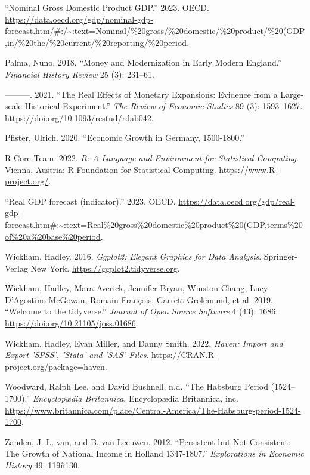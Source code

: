 \documentclass[
  letterpaper,
  DIV=11,
  numbers=noendperiod]{scrartcl}
\newlength{\cslhangindent}
\newlength{\cslentryspacingunit} %
\newenvironment{CSLReferences}[2] %
 {%
  \setlength{\parindent}{0pt}
  \ifodd #1
  \let\oldpar\par
  \def\par{\hangindent=\cslhangindent\oldpar}
  \fi
  \setlength{\parskip}{#2\cslentryspacingunit}
 }%
 {}
\begin{document}
\begin{CSLReferences}{1}{0}
\leavevmode{}%
{``Nominal {Gross} {Domestic} {Product} {GDP}.''} 2023. OECD.
\url{https://data.oecd.org/gdp/nominal-gdp-forecast.htm/\#:/~:text=Nominal/\%20gross/\%20domestic/\%20product/\%20(GDP,in/\%20the/\%20current/\%20reporting/\%20period}.

\leavevmode{}%
Palma, Nuno. 2018. {``Money and Modernization in Early Modern
England.''} \emph{Financial History Review} 25 (3): 231--61.

\leavevmode{}%
---------. 2021. {``{The Real Effects of Monetary Expansions: Evidence
from a Large-scale Historical Experiment}.''} \emph{The Review of
Economic Studies} 89 (3): 1593--1627.
\url{https://doi.org/10.1093/restud/rdab042}.

\leavevmode{}%
Pfister, Ulrich. 2020. {``Economic Growth in Germany, 1500-1800.''}

\leavevmode{}%
R Core Team. 2022. \emph{R: A Language and Environment for Statistical
Computing}. Vienna, Austria: R Foundation for Statistical Computing.
\url{https://www.R-project.org/}.

\leavevmode{}%
{``{Real GDP forecast (indicator)}.''} 2023. OECD.
\url{https://data.oecd.org/gdp/real-gdp-forecast.htm\#:~:text=Real\%20gross\%20domestic\%20product\%20(GDP,terms\%20of\%20a\%20base\%20period}.

\leavevmode{}%
Wickham, Hadley. 2016. \emph{Ggplot2: Elegant Graphics for Data
Analysis}. Springer-Verlag New York.
\url{https://ggplot2.tidyverse.org}.

\leavevmode{}%
Wickham, Hadley, Mara Averick, Jennifer Bryan, Winston Chang, Lucy
D'Agostino McGowan, Romain François, Garrett Grolemund, et al. 2019.
{``Welcome to the {tidyverse}.''} \emph{Journal of Open Source Software}
4 (43): 1686. \url{https://doi.org/10.21105/joss.01686}.

\leavevmode{}%
Wickham, Hadley, Evan Miller, and Danny Smith. 2022. \emph{Haven: Import
and Export 'SPSS', 'Stata' and 'SAS' Files}.
\url{https://CRAN.R-project.org/package=haven}.

\leavevmode{}%
Woodward, Ralph Lee, and David Bushnell. n.d. {``The Habsburg Period
(1524--1700).''} \emph{Encyclopædia Britannica}. Encyclopædia
Britannica, inc.
\url{https://www.britannica.com/place/Central-America/The-Habsburg-period-1524-1700}.

\leavevmode{}%
Zanden, J. L. van, and B. van Leeuwen. 2012. {``Persistent but Not
Consistent: The Growth of National Income in Holland 1347-1807.''}
\emph{Explorations in Economic History} 49: 119ñ130.

\end{CSLReferences}
\end{document}
